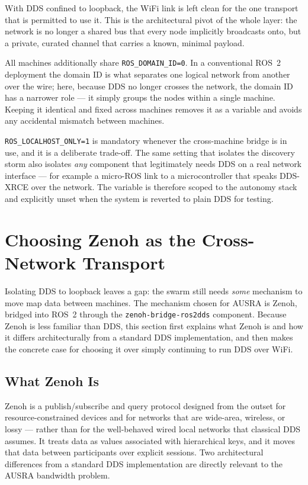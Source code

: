 With DDS confined to loopback, the WiFi link is left clean for the one transport that is permitted to use it. This is the architectural pivot of the whole layer: the network is no longer a shared bus that every node implicitly broadcasts onto, but a private, curated channel that carries a known, minimal payload.

All machines additionally share \texttt{ROS\_DOMAIN\_ID=0}. In a conventional ROS~2 deployment the domain ID is what separates one logical network from another over the wire; here, because DDS no longer crosses the network, the domain ID has a narrower role --- it simply groups the nodes within a single machine. Keeping it identical and fixed across machines removes it as a variable and avoids any accidental mismatch between machines.

\begin{notebox}
\texttt{ROS\_LOCALHOST\_ONLY=1} is mandatory whenever the cross-machine bridge is in use, and it is a deliberate trade-off. The same setting that isolates the discovery storm also isolates \emph{any} component that legitimately needs DDS on a real network interface --- for example a micro-ROS link to a microcontroller that speaks DDS-XRCE over the network. The variable is therefore scoped to the autonomy stack and explicitly unset when the system is reverted to plain DDS for testing.
\end{notebox}

\section{Choosing Zenoh as the Cross-Network Transport}
\label{sec:zenoh}

Isolating DDS to loopback leaves a gap: the swarm still needs \emph{some} mechanism to move map data between machines. The mechanism chosen for AUSRA is Zenoh, bridged into ROS~2 through the \texttt{zenoh-bridge-ros2dds} component. Because Zenoh is less familiar than DDS, this section first explains what Zenoh is and how it differs architecturally from a standard DDS implementation, and then makes the concrete case for choosing it over simply continuing to run DDS over WiFi.

\subsection{What Zenoh Is}
\label{subsec:what_is_zenoh}

Zenoh is a publish/subscribe and query protocol designed from the outset for resource-constrained devices and for networks that are wide-area, wireless, or lossy --- rather than for the well-behaved wired local networks that classical DDS assumes. It treats data as values associated with hierarchical keys, and it moves that data between participants over explicit sessions. Two architectural differences from a standard DDS implementation are directly relevant to the AUSRA bandwidth problem.

